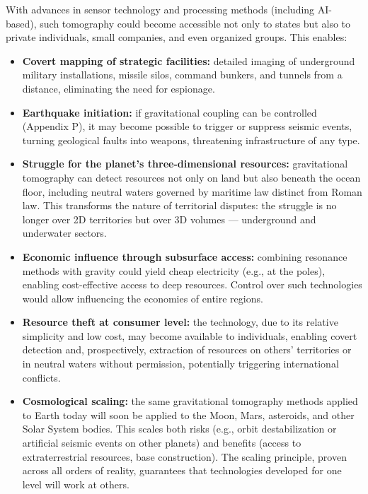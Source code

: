 \documentclass[12pt,a4paper]{article}
\theoremstyle{remark}
\begin{document}
	With advances in sensor technology and processing methods (including AI-based), such tomography could become accessible not only to states but also to private individuals, small companies, and even organized groups. This enables:
	\begin{itemize}[leftmargin=*]
		\item \textbf{Covert mapping of strategic facilities:} detailed imaging of underground military installations, missile silos, command bunkers, and tunnels from a distance, eliminating the need for espionage.
		\item \textbf{Earthquake initiation:} if gravitational coupling can be controlled (Appendix P), it may become possible to trigger or suppress seismic events, turning geological faults into weapons, threatening infrastructure of any type.
		\item \textbf{Struggle for the planet's three-dimensional resources:} gravitational tomography can detect resources not only on land but also beneath the ocean floor, including neutral waters governed by maritime law distinct from Roman law. This transforms the nature of territorial disputes: the struggle is no longer over 2D territories but over 3D volumes — underground and underwater sectors.
		\item \textbf{Economic influence through subsurface access:} combining resonance methods with gravity could yield cheap electricity (e.g., at the poles), enabling cost-effective access to deep resources. Control over such technologies would allow influencing the economies of entire regions.
		\item \textbf{Resource theft at consumer level:} the technology, due to its relative simplicity and low cost, may become available to individuals, enabling covert detection and, prospectively, extraction of resources on others' territories or in neutral waters without permission, potentially triggering international conflicts.
		\item \textbf{Cosmological scaling:} the same gravitational tomography methods applied to Earth today will soon be applied to the Moon, Mars, asteroids, and other Solar System bodies. This scales both risks (e.g., orbit destabilization or artificial seismic events on other planets) and benefits (access to extraterrestrial resources, base construction). The scaling principle, proven across all orders of reality, guarantees that technologies developed for one level will work at others.
	\end{itemize}
	
\end{document}
